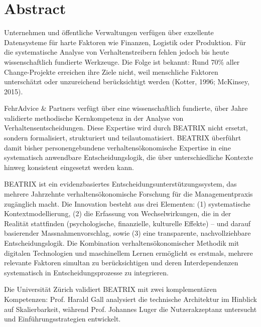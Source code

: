 \documentclass[11pt,a4paper]{article}
\begin{document}

\tableofcontents
\newpage


\section*{Abstract}

Unternehmen und öffentliche Verwaltungen verfügen über exzellente Datensysteme für harte Faktoren wie Finanzen, Logistik oder Produktion. Für die systematische Analyse von Verhaltenstreibern fehlen jedoch bis heute wissenschaftlich fundierte Werkzeuge. Die Folge ist bekannt: Rund 70\% aller Change-Projekte erreichen ihre Ziele nicht, weil menschliche Faktoren unterschätzt oder unzureichend berücksichtigt werden (Kotter, 1996; McKinsey, 2015).

FehrAdvice \& Partners verfügt über eine wissenschaftlich fundierte, über Jahre validierte methodische Kernkompetenz in der Analyse von Verhaltensentscheidungen. Diese Expertise wird durch BEATRIX nicht ersetzt, sondern formalisiert, strukturiert und teilautomatisiert. BEATRIX überführt damit bisher personengebundene verhaltensökonomische Expertise in eine systematisch anwendbare Entscheidungslogik, die über unterschiedliche Kontexte hinweg konsistent eingesetzt werden kann.

BEATRIX ist ein evidenzbasiertes Entscheidungsunterstützungssystem, das mehrere Jahrzehnte verhaltensökonomische Forschung für die Managementpraxis zugänglich macht. Die Innovation besteht aus drei Elementen: (1) systematische Kontextmodellierung, (2) die Erfassung von Wechselwirkungen, die in der Realität stattfinden (psychologische, finanzielle, kulturelle Effekte) -- und darauf basierender Massnahmenvorschlag, sowie (3) eine transparente, nachvollziehbare Entscheidungslogik. Die Kombination verhaltensökonomischer Methodik mit digitalen Technologien und maschinellem Lernen ermöglicht es erstmals, mehrere relevante Faktoren simultan zu berücksichtigen und deren Interdependenzen systematisch in Entscheidungsprozesse zu integrieren.

Die Universität Zürich validiert BEATRIX mit zwei komplementären Kompetenzen: Prof. Harald Gall analysiert die technische Architektur im Hinblick auf Skalierbarkeit, während Prof. Johannes Luger die Nutzerakzeptanz untersucht und Einführungsstrategien entwickelt.
\end{document}
